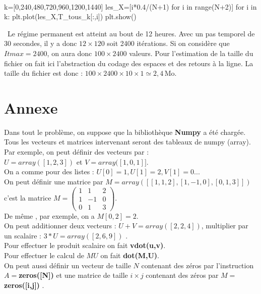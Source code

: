 \ifprof
\begin{corrige}
\question\
\begin{python}
k=[0,240,480,720,960,1200,1440]
les_X=[i*0.4/(N+1) for i in range(N+2)]
for i in k:
    plt.plot(les_X,T_tous_k[:,i])
plt.show()
\end{python}


\question\
Le régime permanent est atteint au bout de 12 heures. Avec un pas temporel de 30 secondes, il y a donc $12\times 120$ 
soit 2400 itérations. Si on considère que $Itmax=2400$, on aura donc $100 \times 2400$ valeurs. Pour l'estimation de la 
taille du fichier on fait ici l'abstraction du codage des espaces et des retours à la ligne. 
La taille du fichier est donc : $100 \times 2400 \times 10 \times 1 \simeq 2,4\, \text{Mo}$.
\end{corrige}
\else

\section{Annexe}
\noindent
Dans tout le problème, on suppose que la bibliothèque \textbf{Numpy} a été chargée.\\
Tous les vecteurs et matrices intervenant seront des tableaux de numpy (array).\\
Par exemple, on peut définir des vecteurs par :\\
 $U=array([1,2,3])$ et $V=array([1,0,1]]$.\\
On a comme pour des listes : $U[0]=1, U[1]=2, V[1]=0$...\\
On peut définir une matrice par $M=array([[1,1,2],[1,-1,0],[0,1,3]])$ c'est la matrice
 $M=\left(\begin{array}{ccc}1&1&2\\1&-1&0 \\ 0&1&3 \end{array} \right)$.\\
De même , par exemple, on a $M[0,2]=2$. \\
On peut additionner deux vecteurs : $U+V=array([2,2,4])$, multiplier par un scalaire :
$3*U=array([2,6,9])$ .\\
Pour effectuer le produit scalaire on fait \textbf{vdot(u,v)}.\\
Pour effectuer le calcul de $MU$ on fait \textbf{dot(M,U)}.\\
On peut aussi définir un vecteur de taille $N$ contenant des zéros par l'instruction 
$A=$\textbf{zeros([N])} et une matrice de taille $i\times j$ contenant des zéros par 
$M=$\textbf{zeros([i,j])} .
\fi


